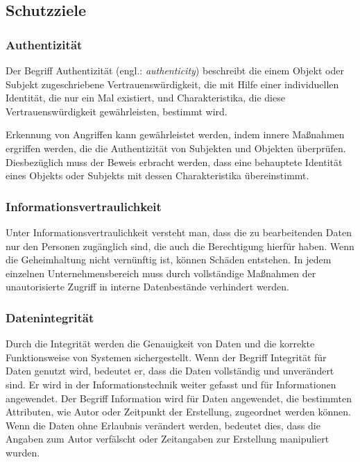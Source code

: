 \subsection{Schutzziele}

\subsubsection{Authentizität}

Der Begriff Authentizität (engl.: \textit{authenticity}) beschreibt die einem Objekt oder Subjekt zugeschriebene Vertrauenswürdigkeit, die mit Hilfe einer individuellen Identität, die nur ein Mal existiert, und Charakteristika, die diese Vertrauenswürdigkeit gewährleisten, bestimmt wird\cite[28]{eckert2013sicherheit}.

Erkennung von Angriffen kann gewährleistet werden, indem innere Maßnahmen ergriffen werden, die die Authentizität von Subjekten und Objekten überprüfen\cite[13]{spies1985datenschutz}. Diesbezüglich muss der Beweis erbracht werden, dass eine behauptete Identität eines Objekts oder Subjekts mit dessen Charakteristika übereinstimmt\cite[28]{eckert2013sicherheit}.

\subsubsection{Informationsvertraulichkeit}
Unter Informationsvertraulichkeit versteht man, dass die zu bearbeitenden Daten nur den Personen zugänglich sind, die auch die Berechtigung hierfür haben. Wenn die Geheimhaltung nicht vernünftig ist, können Schäden entstehen. In jedem einzelnen Unternehmensbereich muss durch vollständige Maßnahmen der unautorisierte Zugriff in interne Datenbestände verhindert werden\cite[205]{gora2003handbuch}.

\subsubsection{Datenintegrität}

Durch die Integrität werden die Genauigkeit von Daten und die korrekte Funktionsweise von Systemen sichergestellt. Wenn der Begriff Integrität für Daten genutzt wird, bedeutet er, dass die Daten vollständig und unverändert sind. Er wird in der Informationstechnik weiter gefasst und für Informationen angewendet. Der Begriff Information wird für Daten angewendet, die bestimmten Attributen, wie Autor oder Zeitpunkt der Erstellung, zugeordnet werden können. Wenn die Daten ohne Erlaubnis verändert werden, bedeutet dies, dass die Angaben zum Autor verfälscht oder Zeitangaben zur Erstellung manipuliert wurden\cite{dtint2007}.

